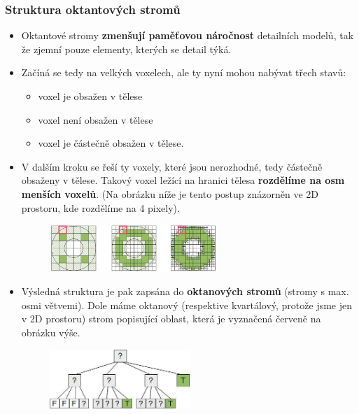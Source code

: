 \subsubsection{Struktura oktantových stromů}
\begin{itemize}
	\item Oktantové stromy \textbf{zmenšují paměťovou náročnost} detailních modelů, tak že zjemní pouze elementy, kterých se detail týká.
	\item Začíná se tedy na velkých voxelech, ale ty nyní mohou nabývat třech stavů:	
	 \begin{itemize}
			\item voxel je obsažen v tělese
			\item voxel není obsažen v tělese
			\item voxel je částečně obsažen v tělese.
	\end{itemize}
	\item V dalším kroku se řeší ty voxely, které jsou nerozhodné, tedy částečně obsaženy v tělese. Takový voxel ležící na hranici tělesa \textbf{rozdělíme na osm menších voxelů}. (Na obrázku níže je tento postup znázorněn ve 2D prostoru, kde rozdělíme na 4 pixely).
		\begin{figure}[H]
		\centering
		\includegraphics[width=0.6\textwidth]{assets/4_octan2}
		\end{figure}
	\item Výsledná struktura je pak zapsána do \textbf{oktanových stromů} (stromy s max. osmi větvemi). Dole máme oktanový (respektive kvartálový, protože jsme jen v 2D prostoru) strom popisující oblast, která je vyznačená červeně na obrázku výše.
		\begin{figure}[H]
		\centering
		\includegraphics[width=0.5\textwidth]{assets/4_octan_struct}
		\end{figure}
\end{itemize}
